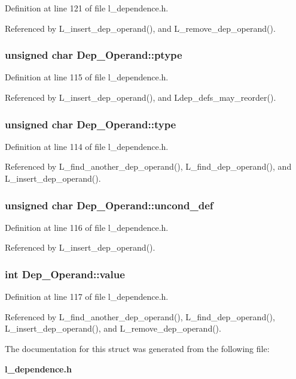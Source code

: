 Definition at line 121 of file l\_\-dependence.h.

Referenced by L\_\-insert\_\-dep\_\-operand(), and L\_\-remove\_\-dep\_\-operand().
\subsubsection{\setlength{\rightskip}{0pt plus 5cm}unsigned char \bf{Dep\_\-Operand::ptype}}\label{structDep__Operand_bded32a0d6663ba050e993d97c4595d0}




Definition at line 115 of file l\_\-dependence.h.

Referenced by L\_\-insert\_\-dep\_\-operand(), and Ldep\_\-defs\_\-may\_\-reorder().
\subsubsection{\setlength{\rightskip}{0pt plus 5cm}unsigned char \bf{Dep\_\-Operand::type}}\label{structDep__Operand_6ecb91754ca9c77ed86282701b9c4805}




Definition at line 114 of file l\_\-dependence.h.

Referenced by L\_\-find\_\-another\_\-dep\_\-operand(), L\_\-find\_\-dep\_\-operand(), and L\_\-insert\_\-dep\_\-operand().
\subsubsection{\setlength{\rightskip}{0pt plus 5cm}unsigned char \bf{Dep\_\-Operand::uncond\_\-def}}\label{structDep__Operand_17e20ffd7a58c9de95f6bed7c32dcb11}




Definition at line 116 of file l\_\-dependence.h.

Referenced by L\_\-insert\_\-dep\_\-operand().
\subsubsection{\setlength{\rightskip}{0pt plus 5cm}int \bf{Dep\_\-Operand::value}}\label{structDep__Operand_dc160357113332acb58a628be253cee6}




Definition at line 117 of file l\_\-dependence.h.

Referenced by L\_\-find\_\-another\_\-dep\_\-operand(), L\_\-find\_\-dep\_\-operand(), L\_\-insert\_\-dep\_\-operand(), and L\_\-remove\_\-dep\_\-operand().

The documentation for this struct was generated from the following file:\begin{CompactItemize}
\item 
\bf{l\_\-dependence.h}\end{CompactItemize}
